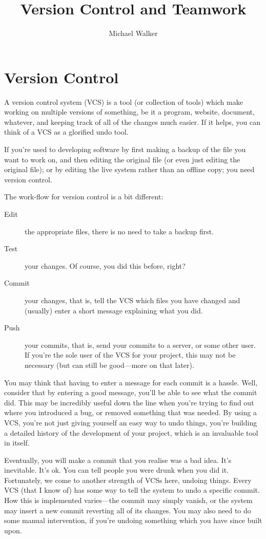 \documentclass[12pt,a4paper]{article}
\author{Michael Walker}
\title{Version Control and Teamwork}
\begin{document}
\maketitle
\tableofcontents
\pagebreak

\section{Version Control}

A version control system (VCS) is a tool (or collection of tools)
which make working on multiple versions of something, be it a program,
website, document, whatever, and keeping track of all of the changes
much easier. If it helps, you can think of a VCS as a glorified undo
tool.

If you're used to developing software by first making a backup of the
file you want to work on, and then editing the original file (or even
just editing the original file); or by editing the live system rather
than an offline copy; you need version control.

The work-flow for version control is a bit different:

\begin{description}
  \item[Edit] the appropriate files, there is no need to take a backup
    first.
  \item[Test] your changes. Of course, you did this before, right?
  \item[Commit] your changes, that is, tell the VCS which files you
    have changed and (usually) enter a short message explaining what
    you did.
  \item[Push] your commits, that is, send your commits to a server,
    or some other user. If you're the sole user of the VCS for your
    project, this may not be necessary (but can still be good---more
    on that later).
\end{description}

You may think that having to enter a message for each commit is a
hassle. Well, consider that by entering a good message, you'll be able
to see what the commit did. This may be incredibly useful down the
line when you're trying to find out where you introduced a bug, or
removed something that was needed. By using a VCS, you're not just
giving yourself an easy way to undo things, you're building a
detailed history of the development of your project, which is an
invaluable tool in itself.

Eventually, you will make a commit that you realise was a bad
idea. It's inevitable. It's ok. You can tell people you were drunk
when you did it. Fortunately, we come to another strength of VCSs
here, undoing things. Every VCS (that I know of) has some way to tell
the system to undo a specific commit. How this is implemented
varies---the commit may simply vanish, or the system may insert a new
commit reverting all of its changes. You may also need to do some
manual intervention, if you're undoing something which you have since
built upon.
\end{document}
